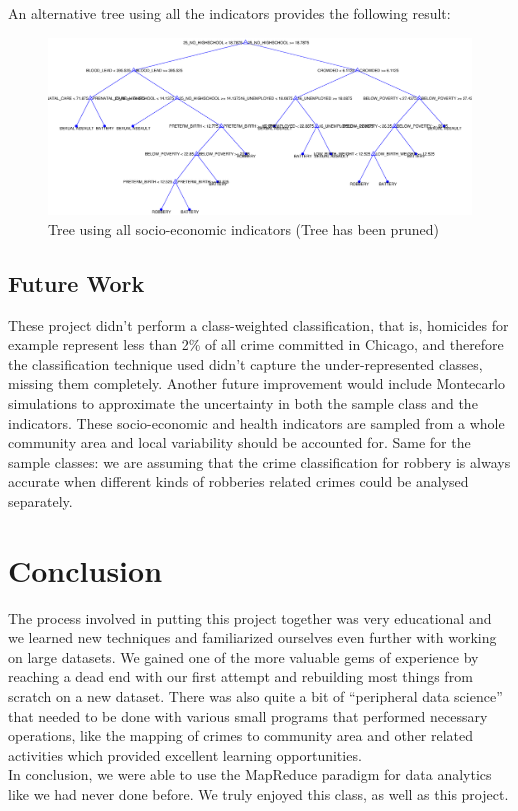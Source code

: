 \documentclass[a4paper,10pt]{article}
\begin{document}
An alternative tree using all the indicators provides the following result:

\begin{figure}[H]
	\centering
	\includegraphics[width=0.6\linewidth]{media/full_tree.eps}
	\caption{Tree using all socio-economic indicators (Tree has been pruned)}
\end{figure}

\subsection{Future Work}

These project didn't perform a class-weighted classification, that is, homicides for example represent less than 2\% of all crime committed in Chicago, and therefore the classification technique used didn't capture the under-represented classes, missing them completely.
Another future improvement would include Montecarlo simulations to approximate the uncertainty in both the sample class and the indicators. These socio-economic and health indicators are sampled from a whole community area and local variability should be accounted for. Same for the sample classes: we are assuming that the crime classification for robbery is always accurate when different kinds of robberies related crimes could be analysed separately.


\section{Conclusion}

The process involved in putting this project together was very educational and we learned new techniques and familiarized ourselves even further with working on large datasets. We gained one of the more valuable gems of experience by reaching a dead end with our first attempt and rebuilding most things from scratch on a new dataset. There was also quite a bit of “peripheral data science” that needed to be done with various small programs that performed necessary operations, like the mapping of crimes to community area and other related activities which provided excellent learning opportunities.\\

In conclusion, we were able to use the MapReduce paradigm for data analytics like we had never done before. We truly enjoyed this class, as well as this project.

\newpage



\end{document}
